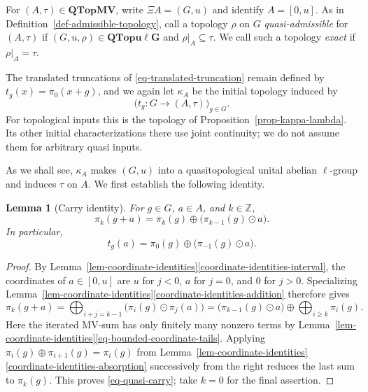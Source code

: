 \documentclass[preprint,3p]{elsarticle}
\theoremstyle{plain}
\newtheorem{lem}[thm]{Lemma}
\theoremstyle{definition}
\newcommand{\QTopMV}{\mathbf{QTopMV}}
\newcommand{\QTopulg}{\mathbf{QTopu\ell G}}
\numberwithin{equation}{section}
\begin{document}
For $(A,\tau)\in\QTopMV$, write $\Xi A=(G,u)$ and identify
$A=[0,u]$.  As in Definition~\ref{def-admissible-topology}, call a
topology $\rho$ on $G$ \emph{quasi-admissible} for $(A,\tau)$ if
$(G,u,\rho)\in\QTopulg$ and $\rho|_A\subseteq\tau$.
We call such a topology \emph{exact} if $\rho|_A=\tau$.

The translated truncations of
\eqref{eq-translated-truncation} remain defined by
$t_g(x)=\pi_0(x+g)$, and we again let $\kappa_A$ be the initial
topology induced by
\begin{equation}
\label{eq-quasi-initial-family}
 \bigl(t_g\colon G\longrightarrow(A,\tau)\bigr)_{g\in G}.
\end{equation}
For topological inputs this is the topology of
Proposition~\ref{prop-kappa-lambda}.  Its other initial
characterizations there use joint continuity; we do not assume
them for arbitrary quasi inputs.

As we shall see, $\kappa_A$ makes $(G,u)$ into a quasitopological
unital abelian $\ell$-group and induces $\tau$ on $A$.
We first establish the following identity.

\begin{lem}[Carry identity]
\label{lem-quasi-carry}
For $g\in G$, $a\in A$, and $k\in\mathbb Z$,
\begin{equation}
\label{eq-quasi-carry}
 \pi_k(g+a)=\pi_k(g)\oplus\bigl(\pi_{k-1}(g)\odot a\bigr).
\end{equation}
In particular,
\begin{equation}
\label{eq-translated-truncation-interval}
 t_g(a)=\pi_0(g)\oplus\bigl(\pi_{-1}(g)\odot a\bigr).
\end{equation}
\end{lem}

\begin{proof}
By Lemma~\ref{lem-coordinate-identities}\ref{coordinate-identities-interval},
the coordinates of $a\in[0,u]$ are $u$ for $j<0$, $a$ for
$j=0$, and $0$ for $j>0$.  Specializing
Lemma~\ref{lem-coordinate-identities}\ref{coordinate-identities-addition} therefore gives
\[
 \pi_k(g+a)
 =\bigoplus_{i+j=k-1}\bigl(\pi_i(g)\odot\pi_j(a)\bigr)
 =\bigl(\pi_{k-1}(g)\odot a\bigr)
   \oplus\bigoplus_{i\geq k}\pi_i(g).
\]
Here the iterated MV-sum has only finitely many nonzero terms by
Lemma~\ref{lem-coordinate-identities}\ref{eq-bounded-coordinate-tails}.  Applying
$\pi_i(g)\oplus\pi_{i+1}(g)=\pi_i(g)$ from
Lemma~\ref{lem-coordinate-identities}\ref{coordinate-identities-absorption} successively from the right
reduces the last sum to $\pi_k(g)$.  This proves
\eqref{eq-quasi-carry}; take $k=0$ for the final assertion.
\end{proof}
\end{document}
